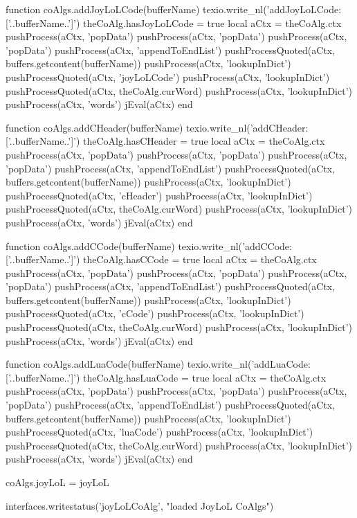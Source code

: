 function coAlgs.addJoyLoLCode(bufferName)
  texio.write_nl('addJoyLoLCode: ['..bufferName..']')
  theCoAlg.hasJoyLoLCode = true
  local aCtx = theCoAlg.ctx
  pushProcess(aCtx, 'popData')
  pushProcess(aCtx, 'popData')
  pushProcess(aCtx, 'popData')
  pushProcess(aCtx, 'appendToEndList')
  pushProcessQuoted(aCtx, buffers.getcontent(bufferName))
  pushProcess(aCtx, 'lookupInDict')
  pushProcessQuoted(aCtx, 'joyLoLCode')
  pushProcess(aCtx, 'lookupInDict')
  pushProcessQuoted(aCtx, theCoAlg.curWord)
  pushProcess(aCtx, 'lookupInDict')
  pushProcess(aCtx, 'words')
  jEval(aCtx)
end

function coAlgs.addCHeader(bufferName)
  texio.write_nl('addCHeader: ['..bufferName..']')
  theCoAlg.hasCHeader = true
  local aCtx = theCoAlg.ctx
  pushProcess(aCtx, 'popData')
  pushProcess(aCtx, 'popData')
  pushProcess(aCtx, 'popData')
  pushProcess(aCtx, 'appendToEndList')
  pushProcessQuoted(aCtx, buffers.getcontent(bufferName))
  pushProcess(aCtx, 'lookupInDict')
  pushProcessQuoted(aCtx, 'cHeader')
  pushProcess(aCtx, 'lookupInDict')
  pushProcessQuoted(aCtx, theCoAlg.curWord)
  pushProcess(aCtx, 'lookupInDict')
  pushProcess(aCtx, 'words')
  jEval(aCtx)
end

function coAlgs.addCCode(bufferName)
  texio.write_nl('addCCode: ['..bufferName..']')
  theCoAlg.hasCCode = true
  local aCtx = theCoAlg.ctx
  pushProcess(aCtx, 'popData')
  pushProcess(aCtx, 'popData')
  pushProcess(aCtx, 'popData')
  pushProcess(aCtx, 'appendToEndList')
  pushProcessQuoted(aCtx, buffers.getcontent(bufferName))
  pushProcess(aCtx, 'lookupInDict')
  pushProcessQuoted(aCtx, 'cCode')
  pushProcess(aCtx, 'lookupInDict')
  pushProcessQuoted(aCtx, theCoAlg.curWord)
  pushProcess(aCtx, 'lookupInDict')
  pushProcess(aCtx, 'words')
  jEval(aCtx)
end

function coAlgs.addLuaCode(bufferName)
  texio.write_nl('addLuaCode: ['..bufferName..']')
  theCoAlg.hasLuaCode = true
  local aCtx = theCoAlg.ctx
  pushProcess(aCtx, 'popData')
  pushProcess(aCtx, 'popData')
  pushProcess(aCtx, 'popData')
  pushProcess(aCtx, 'appendToEndList')
  pushProcessQuoted(aCtx, buffers.getcontent(bufferName))
  pushProcess(aCtx, 'lookupInDict')
  pushProcessQuoted(aCtx, 'luaCode')
  pushProcess(aCtx, 'lookupInDict')
  pushProcessQuoted(aCtx, theCoAlg.curWord)
  pushProcess(aCtx, 'lookupInDict')
  pushProcess(aCtx, 'words')
  jEval(aCtx)
end

coAlgs.joyLoL = joyLoL

interfaces.writestatus('joyLoLCoAlg', "loaded JoyLoL CoAlgs")
\stopLuaCode

